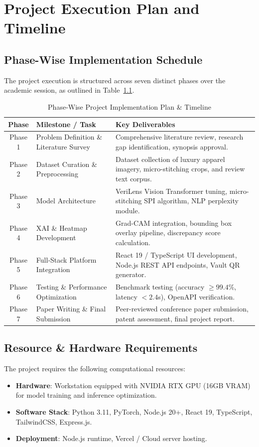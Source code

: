 \chapter{Project Execution Plan and Timeline}

\section{Phase-Wise Implementation Schedule}
The project execution is structured across seven distinct phases over the academic session, as outlined in Table~\ref{tab:project_plan}.

\begin{table}[htbp]
\centering
\caption{Phase-Wise Project Implementation Plan & Timeline}
\label{tab:project_plan}
\small
\begin{tabularx}{\textwidth}{c >{\raggedright\arraybackslash}p{4.5cm} >{\raggedright\arraybackslash}p{6.0cm}}
\toprule
\textbf{Phase} & \textbf{Milestone / Task} & \textbf{Key Deliverables} \\
\midrule
Phase 1 & Problem Definition \& Literature Survey & Comprehensive literature review, research gap identification, synopsis approval. \\
\addlinespace
Phase 2 & Dataset Curation \& Preprocessing & Dataset collection of luxury apparel imagery, micro-stitching crops, and review text corpus. \\
\addlinespace
Phase 3 & Model Architecture & VeriLens Vision Transformer tuning, micro-stitching SPI algorithm, NLP perplexity module. \\
\addlinespace
Phase 4 & XAI \& Heatmap Development & Grad-CAM integration, bounding box overlay pipeline, discrepancy score calculation. \\
\addlinespace
Phase 5 & Full-Stack Platform Integration & React 19 / TypeScript UI development, Node.js REST API endpoints, Vault QR generator. \\
\addlinespace
Phase 6 & Testing \& Performance Optimization & Benchmark testing (accuracy $\ge 99.4\%$, latency $<2.4$s), OpenAPI verification. \\
\addlinespace
Phase 7 & Paper Writing \& Final Submission & Peer-reviewed conference paper submission, patent assessment, final project report. \\
\bottomrule
\end{tabularx}
\end{table}

\section{Resource & Hardware Requirements}
The project requires the following computational resources:
\begin{itemize}
    \item \textbf{Hardware}: Workstation equipped with NVIDIA RTX GPU (16GB VRAM) for model training and inference optimization.
    \item \textbf{Software Stack}: Python 3.11, PyTorch, Node.js 20+, React 19, TypeScript, TailwindCSS, Express.js.
    \item \textbf{Deployment}: Node.js runtime, Vercel / Cloud server hosting.
\end{itemize}

